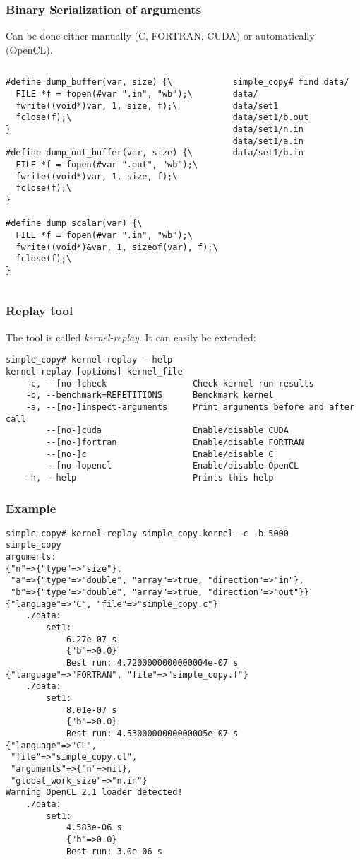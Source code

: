 \documentclass{beamer}
\begin{document}
\begin{frame}[fragile]
\frametitle{Binary Serialization of arguments}
  Can be done either manually (C, FORTRAN, CUDA) or automatically (OpenCL).
  \begin{columns}
  \begin{verbatim}
#define dump_buffer(var, size) {\
  FILE *f = fopen(#var ".in", "wb");\
  fwrite((void*)var, 1, size, f);\
  fclose(f);\
}

#define dump_out_buffer(var, size) {\
  FILE *f = fopen(#var ".out", "wb");\
  fwrite((void*)var, 1, size, f);\
  fclose(f);\
}

#define dump_scalar(var) {\
  FILE *f = fopen(#var ".in", "wb");\
  fwrite((void*)&var, 1, sizeof(var), f);\
  fclose(f);\
}
  \end{verbatim}
  \column{0.5\linewidth}
  \begin{verbatim}
simple_copy# find data/
data/
data/set1
data/set1/b.out
data/set1/n.in
data/set1/a.in
data/set1/b.in
  \end{verbatim}
  \end{columns}
\end{frame}

\begin{frame}[fragile]
\frametitle{Replay tool}
  The tool is called \emph{kernel-replay}. It can easily be extended:
  \begin{verbatim}
simple_copy# kernel-replay --help
kernel-replay [options] kernel_file
    -c, --[no-]check                 Check kernel run results
    -b, --benchmark=REPETITIONS      Benckmark kernel
    -a, --[no-]inspect-arguments     Print arguments before and after call
        --[no-]cuda                  Enable/disable CUDA
        --[no-]fortran               Enable/disable FORTRAN
        --[no-]c                     Enable/disable C
        --[no-]opencl                Enable/disable OpenCL
    -h, --help                       Prints this help
\end{verbatim}
\end{frame}

\begin{frame}[fragile]
  \frametitle{Example}
  \begin{verbatim}
simple_copy# kernel-replay simple_copy.kernel -c -b 5000
simple_copy
arguments:
{"n"=>{"type"=>"size"},
 "a"=>{"type"=>"double", "array"=>true, "direction"=>"in"},
 "b"=>{"type"=>"double", "array"=>true, "direction"=>"out"}}
{"language"=>"C", "file"=>"simple_copy.c"}
	./data:
		set1:
			6.27e-07 s
			{"b"=>0.0}
			Best run: 4.7200000000000004e-07 s
{"language"=>"FORTRAN", "file"=>"simple_copy.f"}
	./data:
		set1:
			8.01e-07 s
			{"b"=>0.0}
			Best run: 4.5300000000000005e-07 s
{"language"=>"CL",
 "file"=>"simple_copy.cl",
 "arguments"=>{"n"=>nil},
 "global_work_size"=>"n.in"}
Warning OpenCL 2.1 loader detected!
	./data:
		set1:
			4.583e-06 s
			{"b"=>0.0}
			Best run: 3.0e-06 s
\end{verbatim}
\end{frame}
\end{document}
